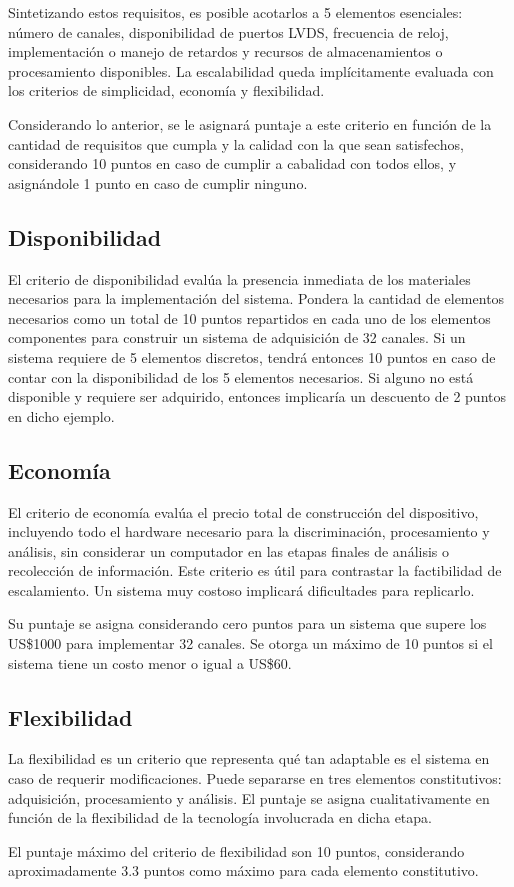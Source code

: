 \par Sintetizando estos requisitos, es posible acotarlos a  5 elementos esenciales: número de canales, disponibilidad de puertos LVDS, frecuencia de reloj, implementación o manejo de retardos y recursos de almacenamientos o procesamiento disponibles. La escalabilidad queda implícitamente evaluada con los criterios de simplicidad, economía y flexibilidad.

\par Considerando lo anterior, se le asignará puntaje a este criterio en función de la cantidad de requisitos que cumpla y la calidad con la que sean satisfechos, considerando 10 puntos en caso de cumplir a cabalidad con todos ellos, y asignándole 1 punto en caso de cumplir ninguno.

\subsection*{Disponibilidad}
\par El criterio de disponibilidad evalúa la presencia inmediata de los materiales necesarios para la implementación del sistema. Pondera la cantidad de elementos necesarios como un total de 10 puntos repartidos en cada uno de los elementos componentes para construir un sistema de adquisición de 32 canales. Si un sistema requiere de 5 elementos discretos, tendrá entonces 10 puntos en caso de contar con la disponibilidad de los 5 elementos necesarios. Si alguno no está disponible y requiere ser adquirido, entonces implicaría un descuento de 2 puntos en dicho ejemplo.

\subsection*{Economía}
\par El criterio de economía evalúa el precio total de construcción del dispositivo, incluyendo todo el hardware necesario para la discriminación, procesamiento y análisis, sin considerar un computador en las etapas finales de análisis o recolección de información. Este criterio es útil para contrastar la factibilidad de escalamiento. Un sistema muy costoso implicará dificultades para replicarlo.
\par Su puntaje se asigna considerando cero puntos para un sistema que supere los US\$1000 para implementar 32 canales. Se otorga un máximo de 10 puntos si el sistema tiene un costo menor o igual a US\$60.

\subsection*{Flexibilidad}
\par La flexibilidad es un criterio que representa qué tan adaptable es el sistema en caso de requerir modificaciones. Puede separarse en tres elementos constitutivos: adquisición, procesamiento y análisis. El puntaje se asigna cualitativamente en función de la flexibilidad de la tecnología involucrada en dicha etapa.
\par El puntaje máximo del criterio de flexibilidad son 10 puntos, considerando aproximadamente 3.3 puntos como máximo para cada elemento constitutivo.

